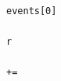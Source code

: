 \documentclass[10pt,a4paper]{article} %
\begin{document}
\begin{lstlisting}
                                                                                                                                                                                                                                                                                                                                                                                                                                                                                                                                                                                                                                                                                                                                                                                                                                                                            events[0]
                                                                                                                                                                                                                                                                                                                                                                                                                                                                                                                                                                                                                                                                                                                                                                                                                                                                                        r
                                                                                                                                                                                                                                                                                                                                                                                                                                                                                                                                                                                                                                                                                                                                                                                                                                                                                        +=

\end{lstlisting}
\end{document}
